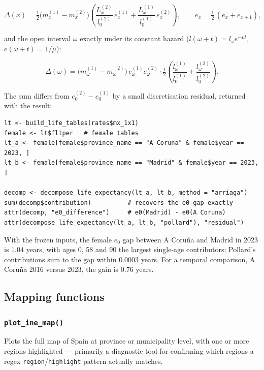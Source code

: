 \documentclass[11pt]{article}
\newcommand{\fn}[1]{\texttt{#1}}
\begin{document}
\begin{equation}
\Delta(x) = \tfrac{1}{2}\bigl(m_x^{(1)} - m_x^{(2)}\bigr)
  \left(\frac{L_x^{(2)}}{l_0^{(2)}}\,\bar e_x^{(1)} + \frac{L_x^{(1)}}{l_0^{(1)}}\,\bar e_x^{(2)}\right),
  \qquad \bar e_x = \tfrac12\,(e_x + e_{x+1}),
\end{equation}

and the open interval $\omega$ exactly under its constant hazard
($l(\omega+t) = l_\omega e^{-\mu t}$, $e(\omega+t) = 1/\mu$):

\begin{equation}
\Delta(\omega) = \bigl(m_\omega^{(1)} - m_\omega^{(2)}\bigr)\, e_\omega^{(1)} e_\omega^{(2)}
  \cdot \tfrac12\left(\frac{l_\omega^{(1)}}{l_0^{(1)}} + \frac{l_\omega^{(2)}}{l_0^{(2)}}\right).
\end{equation}

The sum differs from $e_0^{(2)} - e_0^{(1)}$ by a small discretisation
residual, returned with the result:

\begin{lstlisting}
lt <- build_life_tables(rates$mx_1x1)
female <- lt$fltper   # female tables
lt_a <- female[female$province_name == "A Coruna" & female$year == 2023, ]
lt_b <- female[female$province_name == "Madrid" & female$year == 2023, ]

decomp <- decompose_life_expectancy(lt_a, lt_b, method = "arriaga")
sum(decomp$contribution)          # recovers the e0 gap exactly
attr(decomp, "e0_difference")     # e0(Madrid) - e0(A Coruna)
attr(decompose_life_expectancy(lt_a, lt_b, "pollard"), "residual")
\end{lstlisting}

With the frozen inputs, the female $e_0$ gap between A Coru\~{n}a and
Madrid in 2023 is $1.04$ years, with ages 0, 58 and 90 the largest
single-age contributors; Pollard's contributions sum to the gap within
$0.0003$ years. For a temporal comparison, A Coru\~{n}a 2016 versus 2023, the
gain is $0.76$ years.

\subsection{Mapping functions}

\subsubsection{\fn{plot\_ine\_map()}}

Plots the full map of Spain at province or municipality level, with one or
more regions highlighted --- primarily a diagnostic tool for confirming
which regions a regex \fn{region}/\fn{highlight} pattern actually matches.
\end{document}
